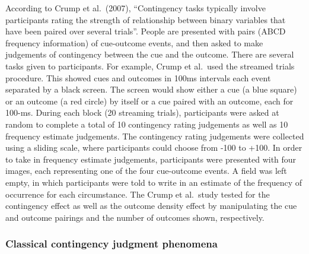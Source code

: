 \documentclass[
  english,
  man,floatsintext]{apa6}
\begin{document}
According to Crump et al.~(2007), \enquote{Contingency tasks typically involve participants rating the strength of relationship between binary variables that have been paired over several trials}. People are presented with pairs (ABCD frequency information) of cue-outcome events, and then asked to make judgements of contingency between the cue and the outcome. There are several tasks given to participants. For example, Crump et al.~used the streamed trials procedure. This showed cues and outcomes in 100ms intervals each event separated by a black screen. The screen would show either a cue (a blue square) or an outcome (a red circle) by itself or a cue paired with an outcome, each for 100-ms. During each block (20 streaming trials), participants were asked at random to complete a total of 10 contingency rating judgements as well as 10 frequency estimate judgements. The contingency rating judgements were collected using a sliding scale, where participants could choose from -100 to +100. In order to take in frequency estimate judgements, participants were presented with four images, each representing one of the four cue-outcome events. A field was left empty, in which participants were told to write in an estimate of the frequency of occurrence for each circumstance. The Crump et al.~study tested for the contingency effect as well as the outcome density effect by manipulating the cue and outcome pairings and the number of outcomes shown, respectively.

\hypertarget{classical-contingency-judgment-phenomena}{%
\subsubsection{Classical contingency judgment phenomena}\label{classical-contingency-judgment-phenomena}}
\end{document}
